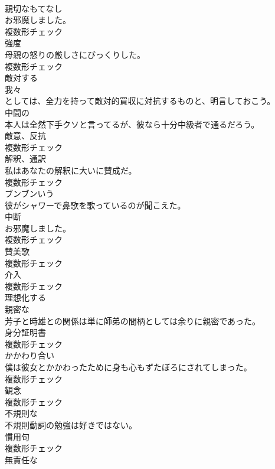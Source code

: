\documentclass[8pt]{extreport}
\begin{document}
\begin{CJK}{UTF8}{min}
\\	[名詞]	親切なもてなし	
\\	お邪魔しました。	
\\	複数形チェック
\\	[名詞]	強度	
\\	母親の怒りの厳しさにびっくりした。	
\\	複数形チェック
\\	[形容詞]	敵対する	
\\	我々
\\	としては、全力を持って敵対的買収に対抗するものと、明言しておこう。	
\\	[形容詞]	中間の	
\\	本人は全然下手クソと言ってるが、彼なら十分中級者で通るだろう。	
\\	[名詞]	敵意、反抗	
\\	複数形チェック
\\	[名詞]	解釈、通訳	
\\	私はあなたの解釈に大いに賛成だ。	
\\	複数形チェック
\\	[動詞]	ブンブンいう	
\\	彼がシャワーで鼻歌を歌っているのが聞こえた。	
\\	[名詞]	中断	
\\	お邪魔しました。	
\\	複数形チェック
\\	[名詞]	賛美歌	
\\	複数形チェック
\\	[名詞]	介入	
\\	複数形チェック
\\	[動詞]	理想化する	
\\	[形容詞]	親密な	
\\	芳子と時雄との関係は単に師弟の間柄としては余りに親密であった。	
\\	[名詞]	身分証明書	
\\	複数形チェック
\\	[名詞]	かかわり合い	
\\	僕は彼女とかかわったために身も心もずたぼろにされてしまった。	
\\	複数形チェック
\\	[名詞]	観念	
\\	複数形チェック
\\	[形容詞]	不規則な	
\\	不規則動詞の勉強は好きではない。	
\\	[名詞]	慣用句	
\\	複数形チェック
\\	[形容詞]	無責任な	

\end{CJK}
\end{document}

